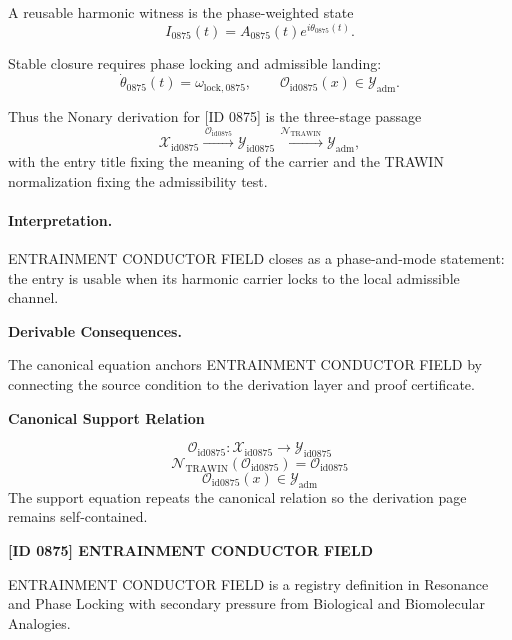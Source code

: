 A reusable harmonic witness is the phase-weighted state\[
I_{0875}(t)=A_{0875}(t)e^{i\theta_{0875}(t)}.
\]

Stable closure requires phase locking and admissible landing:\[
\dot{\theta}_{0875}(t)=\omega_{\mathrm{lock},0875},\qquad \mathcal{O}_{\mathrm{id0875}}(x)\in\mathcal{Y}_{\mathrm{adm}}.
\]

Thus the Nonary derivation for [ID 0875] is the three-stage passage
\[
\mathcal{X}_{\mathrm{id0875}}\xrightarrow{\,\mathcal{O}_{\mathrm{id0875}}\,} \mathcal{Y}_{\mathrm{id0875}}\xrightarrow{\,\mathcal{N}_{\mathrm{TRAWIN}}\,} \mathcal{Y}_{\mathrm{adm}},
\]
with the entry title fixing the meaning of the carrier and the TRAWIN normalization fixing the admissibility test.

\paragraph{Interpretation.} ENTRAINMENT CONDUCTOR FIELD closes as a phase-and-mode statement: the entry is usable when its harmonic carrier locks to the local admissible channel.

\par\vspace{0.35em}
\noindent\textbf{Derivable Consequences.}\quad
\begingroup
\footnotesize
\raggedright
The canonical equation anchors ENTRAINMENT CONDUCTOR FIELD by connecting the source condition to the derivation layer and proof certificate.
\par\endgroup

\noindent\textbf{Canonical Support Relation}\par
\[
\mathcal{O}_{\mathrm{id0875}}:\mathcal{X}_{\mathrm{id0875}}\longrightarrow\mathcal{Y}_{\mathrm{id0875}}
\]
\[
\mathcal{N}_{\mathrm{TRAWIN}}(\mathcal{O}_{\mathrm{id0875}})=\mathcal{O}_{\mathrm{id0875}}
\]
\[
\mathcal{O}_{\mathrm{id0875}}(x)\in\mathcal{Y}_{\mathrm{adm}}
\]
\noindent The support equation repeats the canonical relation so the derivation page remains self-contained.\par

\clearpage
\noindent\textbf{[ID 0875] ENTRAINMENT CONDUCTOR FIELD}\par
\vspace{0.35em}
\begingroup\small
{}
ENTRAINMENT CONDUCTOR FIELD is a registry definition in Resonance and Phase Locking with secondary pressure from Biological and Biomolecular Analogies.

